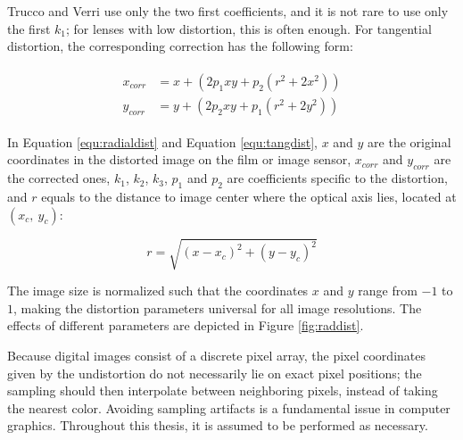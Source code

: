 Trucco and Verri \cite{trucco1998introductory} use only the two first coefficients, and it is not rare to use only the first $k_1$; for lenses with low distortion, this is often enough.
For tangential distortion, the corresponding correction has the following form:

\begin{align} \label{equ:tangdist} \begin{split}
x_{corr} &= x + (2 p_1 x y + p_2 (r^2 + 2 x^2))\\
y_{corr} &= y + (2 p_2 x y + p_1 (r^2 + 2 y^2))
\end{split} \end{align}

In Equation \ref{equ:radialdist} and Equation \ref{equ:tangdist}, $x$ and $y$ are the original coordinates in the distorted image on the film or image sensor, $x_{corr}$ and $y_{corr}$ are the corrected ones, $k_1$, $k_2$, $k_3$, $p_1$ and $p_2$ are coefficients specific to the distortion, and $r$ equals to the distance to image center where the optical axis lies, located at $(x_c,~y_c)$:

\begin{equation}
r = \sqrt{(x - x_c)^2 + (y - y_c)^2}
\end{equation}


The image size is normalized such that the coordinates $x$ and $y$ range from $-1$ to $1$, making the distortion parameters universal for all image resolutions.
The effects of different parameters are depicted in Figure \ref{fig:raddist}.


Because digital images consist of a discrete pixel array, the pixel coordinates given by the undistortion do not necessarily lie on exact pixel positions; the sampling should then interpolate between neighboring pixels, instead of taking the nearest color.
Avoiding sampling artifacts is a fundamental issue in computer graphics.
\cite{wolberg1990digital}
Throughout this thesis, it is assumed to be performed as necessary.


